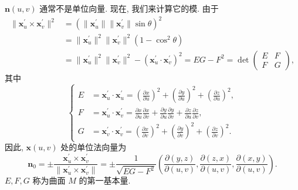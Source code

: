 $\boldsymbol{n}(u,v)$ 通常不是单位向量. 现在, 我们来计算它的模. 由于
\begin{align*}
  \|\boldsymbol{x}_{u}^{\prime} \times \boldsymbol{x}_{v}^{\prime}\|^{2}
  &= (\|\boldsymbol{x}_{u}^{\prime}\| \|\boldsymbol{x}_{v}^{\prime}\| \sin\theta)^{2} \\
  &= \|\boldsymbol{x}_{u}^{\prime}\|^{2} \|\boldsymbol{x}_{v}^{\prime}\|^{2} (1 - \cos^{2}\theta) \\
  &= \|\boldsymbol{x}_{u}^{\prime}\|^{2} \|\boldsymbol{x}_{v}^{\prime}\|^{2} - (\boldsymbol{x}_{u}^{\prime} \cdot \boldsymbol{x}_{v}^{\prime})^{2} = EG - F^{2} = \det\begin{pmatrix} E & F \\ F & G \end{pmatrix},
\end{align*}
其中
\[
  \left\{\begin{aligned}
    E &= \boldsymbol{x}_{u}^{\prime} \cdot \boldsymbol{x}_{u}^{\prime} = \left(\frac{\partial x}{\partial u}\right)^{2} + \left(\frac{\partial y}{\partial u}\right)^{2} + \left(\frac{\partial z}{\partial u}\right)^{2}, \\
    F &= \boldsymbol{x}_{u}^{\prime} \cdot \boldsymbol{x}_{v}^{\prime} = \frac{\partial x}{\partial u}\frac{\partial x}{\partial v} + \frac{\partial y}{\partial u}\frac{\partial y}{\partial v} + \frac{\partial z}{\partial u}\frac{\partial z}{\partial v}, \\
    G &= \boldsymbol{x}_{v}^{\prime} \cdot \boldsymbol{x}_{v}^{\prime} = \left(\frac{\partial x}{\partial v}\right)^{2} + \left(\frac{\partial y}{\partial v}\right)^{2} + \left(\frac{\partial z}{\partial v}\right)^{2}.
  \end{aligned}\right.
\]
因此, $\boldsymbol{x}(u,v)$ 处的单位法向量为
\[
  \boldsymbol{n}_{0} = \pm\frac{\boldsymbol{x}_{u}^{\prime} \times \boldsymbol{x}_{v}^{\prime}}{\|\boldsymbol{x}_{u}^{\prime} \times \boldsymbol{x}_{v}^{\prime}\|} = \pm\frac{1}{\sqrt{EG - F^{2}}}\left(\frac{\partial(y,z)}{\partial(u,v)}, \frac{\partial(z,x)}{\partial(u,v)}, \frac{\partial(x,y)}{\partial(u,v)}\right).
\]
$E, F, G$ 称为曲面 $M$ 的第一基本量.

